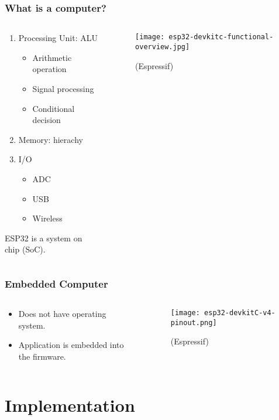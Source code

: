 \documentclass[compress, aspectratio=32]{beamer}
\begin{document}
\begin{frame}
    \frametitle{What is a computer?}
    \begin{columns}
        \begin{column}{0.4\textwidth}
            \begin{enumerate}
                \item Processing Unit: ALU
                    \begin{itemize}
                        \item Arithmetic operation
                        \item Signal processing
                        \item Conditional decision
                    \end{itemize}
                \item Memory: hierachy
                \item I/O
                \begin{itemize}
                    \item ADC
                    \item USB
                    \item Wireless
                \end{itemize}
            \end{enumerate}
            ESP32 is a system on chip (SoC).
        \end{column}
        \begin{column}{0.6\textwidth}
            \begin{figure}
                \texttt{[image: esp32-devkitc-functional-overview.jpg]}
                \caption*{(Espressif)}
            \end{figure}
        \end{column}
    \end{columns}
\end{frame}

\begin{frame}
    \frametitle{Embedded Computer}
    \begin{columns}
        \begin{column}[]{0.4\textwidth}
            \begin{itemize}
                \item Does not have operating system.
                \item Application is embedded into the firmware.
            \end{itemize}
        \end{column}
        \begin{column}[]{0.6\textwidth}
            \begin{figure}
                \texttt{[image: esp32-devkitC-v4-pinout.png]}
                \caption*{(Espressif)}
            \end{figure}
        \end{column}
    \end{columns}
\end{frame}

\section{Implementation}
\end{document}
